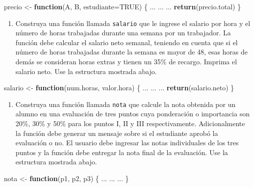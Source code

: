 \documentclass[10pt,]{krantz}
\makeatletter
\newenvironment{Shaded}{\begin{snugshade}}{\end{snugshade}}
\newcommand{\KeywordTok}[1]{\textcolor[rgb]{0.13,0.29,0.53}{\textbf{#1}}}
\newcommand{\DataTypeTok}[1]{\textcolor[rgb]{0.13,0.29,0.53}{#1}}
\newcommand{\StringTok}[1]{\textcolor[rgb]{0.31,0.60,0.02}{#1}}
\newcommand{\OtherTok}[1]{\textcolor[rgb]{0.56,0.35,0.01}{#1}}
\newcommand{\ControlFlowTok}[1]{\textcolor[rgb]{0.13,0.29,0.53}{\textbf{#1}}}
\newcommand{\NormalTok}[1]{#1}
\providecommand{\tightlist}{%
  \setlength{\itemsep}{0pt}\setlength{\parskip}{0pt}}
\newenvironment{kframe}{%
\medskip{}
\setlength{\fboxsep}{.8em}
 \def\at@end@of@kframe{}%
 \ifinner\ifhmode%
  \def\at@end@of@kframe{\end{minipage}}%
  \begin{minipage}{\columnwidth}%
 \fi\fi%
 \def\FrameCommand##1{\hskip\@totalleftmargin \hskip-\fboxsep
 \colorbox{shadecolor}{##1}\hskip-\fboxsep
     \hskip-\linewidth \hskip-\@totalleftmargin \hskip\columnwidth}%
 \MakeFramed {\advance\hsize-\width
   \@totalleftmargin\z@ \linewidth\hsize
   \@setminipage}}%
 {\par\unskip\endMakeFramed%
 \at@end@of@kframe}
\renewenvironment{Shaded}{\begin{kframe}}{\end{kframe}}
\makeatother
\begin{document}
\begin{Shaded}
\begin{Highlighting}[]
\NormalTok{precio <-}\StringTok{ }\ControlFlowTok{function}\NormalTok{(A, B, }\DataTypeTok{estudiante=}\OtherTok{TRUE}\NormalTok{) \{}
\NormalTok{  ...}
\NormalTok{  ...}
\NormalTok{  ...}
  \KeywordTok{return}\NormalTok{(precio.total)}
\NormalTok{\}}
\end{Highlighting}
\end{Shaded}

\begin{enumerate}
\def\labelenumi{\arabic{enumi}.}
\setcounter{enumi}{7}
\tightlist
\item
  Construya una función llamada \texttt{salario} que le ingrese el
  salario por hora y el número de horas trabajadas durante una semana
  por un trabajador. La función debe calcular el salario neto semanal,
  teniendo en cuenta que si el número de horas trabajadas durante la
  semana es mayor de 48, esas horas de demás se consideran horas extras
  y tienen un 35\% de recargo. Imprima el salario neto. Use la
  estructura mostrada abajo.
\end{enumerate}

\begin{Shaded}
\begin{Highlighting}[]
\NormalTok{salario <-}\StringTok{ }\ControlFlowTok{function}\NormalTok{(num.horas, valor.hora) \{}
\NormalTok{  ...}
\NormalTok{  ...}
\NormalTok{  ...}
  \KeywordTok{return}\NormalTok{(salario.neto)}
\NormalTok{\}}
\end{Highlighting}
\end{Shaded}

\begin{enumerate}
\def\labelenumi{\arabic{enumi}.}
\setcounter{enumi}{8}
\tightlist
\item
  Construya una función llamada \texttt{nota} que calcule la nota
  obtenida por un alumno en una evaluación de tres puntos cuya
  ponderación o importancia son 20\%, 30\% y 50\% para los puntos I, II
  y III respectivamente. Adicionalmente la función debe generar un
  mensaje sobre si el estudiante aprobó la evaluación o no. El usuario
  debe ingresar las notas individuales de los tres puntos y la función
  debe entregar la nota final de la evaluación. Use la estructura
  mostrada abajo.
\end{enumerate}

\begin{Shaded}
\begin{Highlighting}[]
\NormalTok{nota <-}\StringTok{ }\ControlFlowTok{function}\NormalTok{(p1, p2, p3) \{}
\NormalTok{  ...}
\NormalTok{  ...}
\NormalTok{  ...}
\NormalTok{\}}
\end{Highlighting}
\end{Shaded}
\end{document}
